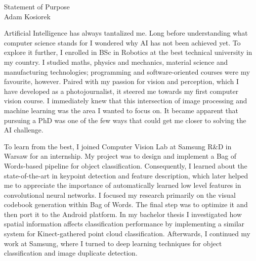 \documentclass[12pt]{article}
\begin{document}
\begin{center}
{\Large Statement of Purpose} \\[.3in]
{\large Adam Kosiorek}
\end{center}



Artificial Intelligence has always tantalized me. Long before understanding what computer science stands for I wondered why AI has not been achieved yet. To explore it further, I enrolled in BSc in Robotics at the best technical university in my country. I studied maths, physics and mechanics, material science and manufacturing technologies; programming and software-oriented courses were my favourite, however. Paired with my passion for vision and perception, which I have developed as a photojournalist, it steered me towards my first computer vision course. I immediately knew that this intersection of image processing and machine learning was the area I wanted to focus on. It became apparent that pursuing a PhD was one of the few ways that could get me closer to solving the AI challenge.

To learn from the best, I joined Computer Vision Lab at Samsung R\&D in Warsaw for an internship. My project was to design and implement a Bag of Words-based pipeline for object classification. Consequently, I learned about the state-of-the-art in keypoint detection and feature description, which later helped me to appreciate the importance of automatically learned low level features in convolutional neural networks. I focused my research primarily on the visual codebook generation within Bag of Words. The final step was to optimize it and then port it to the Android platform. In my bachelor thesis I investigated how spatial information affects classification performance by implementing a similar system for Kinect-gathered point cloud classification. Afterwards, I continued my work at Samsung, where I turned to deep learning techniques for object classification and image duplicate detection.
\end{document}
